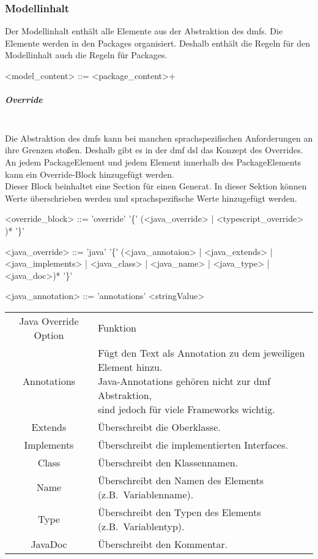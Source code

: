 \documentclass[./einleitung.tex]{subfiles}
\begin{document}
\subsubsection{Modellinhalt}
Der Modellinhalt enthält alle Elemente aus der Abstraktion des \acrshort{dmf}s.
Die Elemente werden in den Packages organisiert.
Deshalb enthält die Regeln für den Modellinhalt auch die Regeln für Packages.

\begin{grammar}
<model_content> ::= <package_content>+
\end{grammar}

\subparagraph{Override}\mbox{}\\
Die Abstraktion des \acrshort{dmf}s kann bei manchen sprachspezifischen Anforderungen an ihre Grenzen stoßen.
Deshalb gibt es in der \acrshort{dmf} \acrshort{dsl} das Konzept des Overrides.
An jedem PackageElement und jedem Element innerhalb des PackageElements kann ein Override-Block hinzugefügt werden. \\
Dieser Block beinhaltet eine Section für einen Generat.
In dieser Sektion können Werte überschrieben werden und sprachspezifische Werte hinzugefügt werden.\\
\begin{grammar}
<override_block> ::= 'override' '\{' (<java_override> | <typescript_override> )* '\}'

<java_override> ::= 'java' '\{' (<java_annotaion> | <java_extends> | <java_implements> | <java_class> | <java_name> | <java_type> | <java_doc>)* '\}'

<java_annotation> ::= 'annotations' <stringValue>
\end{grammar}
\begin{center}
\begin{tabular}{| c || m{26em} |}
\hline
Java Override Option & Funktion\\
\hhline{|=||=|}
Annotations & \makecell[l]{Fügt den Text als Annotation zu dem jeweiligen Element hinzu.\\
Java-Annotations gehören nicht zur \acrshort{dmf} Abstraktion,\\ sind jedoch für viele Frameworks wichtig.}\\
\hline
Extends & Überschreibt die Oberklasse.\\
\hline
Implements & Überschreibt die implementierten Interfaces.\\
\hline
Class & Überschreibt den Klassennamen.\\
\hline
Name & Überschreibt den Namen des Elements (z.B.\ Variablenname).\\
\hline
Type & Überschreibt den Typen des Elements (z.B.\ Variablentyp).\\
\hline
JavaDoc & Überschreibt den Kommentar.\\
\hline
\end{tabular}
\end{center}
\end{document}
